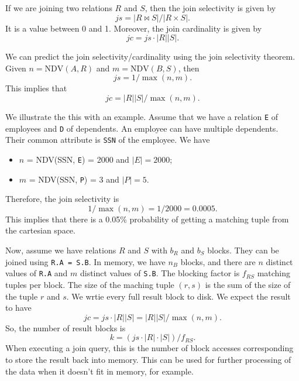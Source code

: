 \documentclass[a4paper, openany]{memoir}
\theoremstyle{definition}
\theoremstyle{plain}
\begin{document}
If we are joining two relations $R$ and $S$, then the join selectivity is given by
\[\textit{js} = |R \bowtie S|/|R \times S|.\]
It is a value between 0 and 1. Moreover, the join cardinality is given by
\[\textit{jc} = \textit{js} \cdot |R| |S|.\]

We can predict the join selectivity/cardinality using the join selectivity theorem. Given $n = \text{NDV}(A, R)$ and $m = \text{NDV}(B, S)$, then
\[\textit{js} = 1/\max(n, m).\]
This implies that 
\[\textit{jc} = |R| |S| / \max(n, m).\]

We illustrate the this with an example. Assume that we have a relation \texttt{E} of employees and \texttt{D} of dependents. An employee can have multiple dependents. Their common attribute is \texttt{SSN} of the employee. We have
\begin{itemize}
    \item $n$ = NDV(SSN, \texttt{E}) = 2000 and $|E| = 2000$;
    \item $m$ = NDV(SSN, \texttt{P}) = 3 and $|P| = 5$.
\end{itemize}
Therefore, the join selectivity is
\[1/\max(n, m) = 1/2000 = 0.0005.\]
This implies that there is a 0.05\% probability of getting a matching tuple from the cartesian space.

Now, assume we have relations $R$ and $S$ with $b_R$ and $b_S$ blocks. They can be joined using \texttt{R.A = S.B}. In memory, we have $n_B$ blocks, and there are $n$ distinct values of \texttt{R.A} and $m$ distinct values of \texttt{S.B}. The blocking factor is $f_{RS}$ matching tuples per block. The size of the maching tuple $(r, s)$ is the sum of the size of the tuple $r$ and $s$. We wrtie every full result block to disk. We expect the result to have
\[\textit{jc} = \textit{js} \cdot  |R| |S| = |R| |S| /\max(n, m).\]
So, the number of result blocks is
\[k = (\textit{js} \cdot |R| \cdot |S|)/f_{RS}.\]
When executing a join query, this is the number of block accesses corresponding to store the result back into memory. This can be used for further processing of the data when it doesn't fit in memory, for example.  
\end{document}
